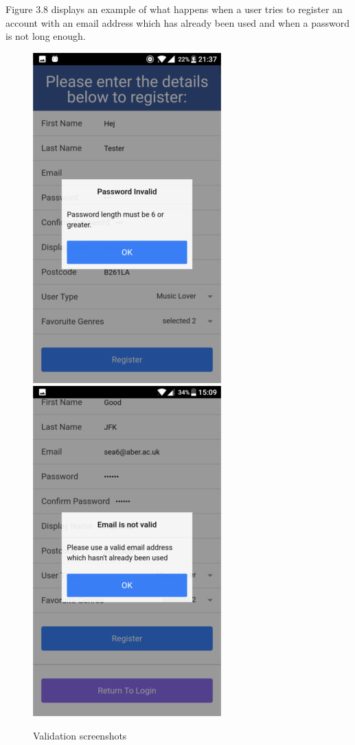 Figure 3.8 displays an example of what happens when a user tries to register an account with an email address which has already been used and when a password is not long enough.
\begin{center}
\begin{figure}[H]
\begin{center}
\includegraphics[scale=0.5]{images/sc5}
\includegraphics[scale=0.5]{images/sc6}
\end{center}
\caption{Validation screenshots}
\end{figure}
\end{center}


